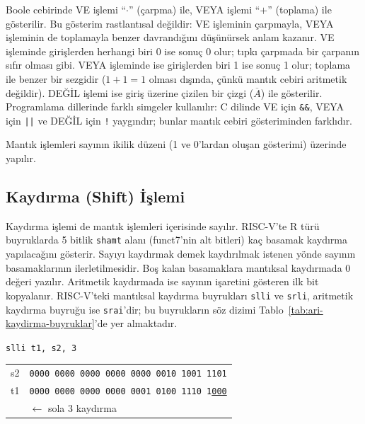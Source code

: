Boole cebirinde VE işlemi ``$\cdot$'' (çarpma) ile, VEYA işlemi ``$+$'' (toplama) ile gösterilir. Bu gösterim rastlantısal değildir: VE işleminin çarpmayla, VEYA işleminin de toplamayla benzer davrandığını düşünürsek anlam kazanır. VE işleminde girişlerden herhangi biri 0 ise sonuç 0 olur; tıpkı çarpmada bir çarpanın sıfır olması gibi. VEYA işleminde ise girişlerden biri 1 ise sonuç 1 olur; toplama ile benzer bir sezgidir ($1 + 1 = 1$ olması dışında, çünkü mantık cebiri aritmetik değildir). DEĞİL işlemi ise giriş üzerine çizilen bir çizgi ($\overline{A}$) ile gösterilir. Programlama dillerinde farklı simgeler kullanılır: C dilinde VE için \texttt{\&\&}, VEYA için \texttt{||} ve DEĞİL için \texttt{!} yaygındır; bunlar mantık cebiri gösteriminden farklıdır.

Mantık işlemleri sayının ikilik düzeni (1 ve 0'lardan oluşan gösterimi) üzerinde yapılır.

\subsection{Kaydırma (Shift) İşlemi}

Kaydırma işlemi de mantık işlemleri içerisinde sayılır. RISC-V'te R türü buyruklarda 5 bitlik \texttt{shamt} alanı (funct7'nin alt bitleri) kaç basamak kaydırma yapılacağını gösterir. Sayıyı kaydırmak demek kaydırılmak istenen yönde sayının basamaklarının ilerletilmesidir. Boş kalan basamaklara mantıksal kaydırmada 0 değeri yazılır. Aritmetik kaydırmada ise sayının işaretini gösteren ilk bit kopyalanır. RISC-V'teki mantıksal kaydırma buyrukları \texttt{slli} ve \texttt{srli}, aritmetik kaydırma buyruğu ise \texttt{srai}'dir; bu buyrukların söz dizimi Tablo~\ref{tab:ari-kaydirma-buyruklar}'de yer almaktadır.

\begin{center}\texttt{slli t1, s2, 3} \end{center}\vspace{-6pt}
\begin{center}
\small
\begin{tabular}{r@{\;\;}l}
  s2 & \texttt{0000\,0000\,0000\,0000\,0000\,0010\,1001\,1101} \\
  t1 & \texttt{0000\,0000\,0000\,0000\,0001\,0100\,1110\,1\underline{000}} \\
  & \hfill$\longleftarrow$ \textnormal{sola 3 kaydırma} \\
\end{tabular}
\end{center}

